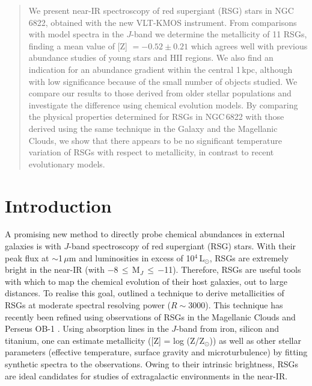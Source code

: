 \documentclass[iop]{emulateapj}
\begin{document}
\begin{abstract}
We present near-IR spectroscopy of red supergiant (RSG) stars in NGC\,6822, obtained with the new VLT-KMOS instrument.
From comparisons with model spectra in the $J$-band we determine the metallicity of 11 RSGs, finding a mean value of [Z] $= -0.52 \pm 0.21$ which agrees well with previous abundance studies of young stars and HII regions.
We also find an indication for an abundance gradient within the central 1\,kpc, although with low significance because
of the small number of objects studied.
We compare our results to those derived from older stellar populations and investigate the difference using chemical evolution models.
By comparing the physical properties determined for RSGs in NGC\,6822 with those derived using the same technique in the Galaxy and the Magellanic Clouds, we show that there appears to be no significant temperature variation of RSGs with respect to metallicity, in contrast to recent evolutionary models.
\end{abstract}




\section{Introduction}

\label{sec:introduction}
A promising new method to directly probe chemical abundances in external galaxies is with $J$-band spectroscopy of red supergiant (RSG) stars.
With their peak flux at
$\sim$1\,$\mu$m and luminosities in excess of
10$^4$\,L$_\odot$, RSGs are extremely bright in the near-IR
(with $-$8\,$\le$\,M$_{J}$\,$\le$\,$-$11).
Therefore, RSGs are useful tools with which to map the chemical evolution of their host galaxies, out to large distances.
To realise this goal,
\cite{2010MNRAS.407.1203D} outlined a technique to derive metallicities of RSGs at moderate spectral resolving power
($R\sim$3000).
This technique has recently been refined using observations of RSGs in the Magellanic Clouds
\citep{Davies-prep} and Perseus OB-1
\citep{2014ApJ...788...58G}.
Using absorption lines in the $J$-band from iron, silicon and titanium, one can estimate metallicity
([Z] = log (Z/Z$_{\odot}$)) as well as other stellar parameters
(effective temperature, surface gravity and microturbulence) by fitting synthetic spectra to the observations.
Owing to their intrinsic brightness,
RSGs are ideal candidates for studies of extragalactic environments in the near-IR.
\end{document}
